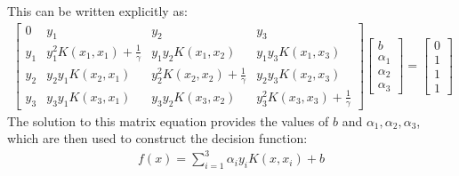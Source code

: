 This can be written explicitly as:
\begin{align*}
	\begin{bmatrix}
	0 & y_1 & y_2 & y_3 \\
	y_1 & y_1^2 K(x_1, x_1) + \frac{1}{\gamma} & y_1 y_2 K(x_1, x_2) & y_1 y_3 K(x_1, x_3) \\
	y_2 & y_2 y_1 K(x_2, x_1) & y_2^2 K(x_2, x_2) + \frac{1}{\gamma} & y_2 y_3 K(x_2, x_3) \\
	y_3 & y_3 y_1 K(x_3, x_1) & y_3 y_2 K(x_3, x_2) & y_3^2 K(x_3, x_3) + \frac{1}{\gamma}
	\end{bmatrix}
	\begin{bmatrix}
	b \\
	\alpha_1 \\
	\alpha_2 \\
	\alpha_3
	\end{bmatrix}
	=
	\begin{bmatrix}
	0 \\
	1 \\
	1 \\
	1
	\end{bmatrix}
\end{align*}
The solution to this matrix equation provides the values of $b$ and $ \alpha_1, \alpha_2, \alpha_3$, which are then used to construct the decision function:
\begin{align*}
	f(x) = \sum_{i=1}^3 \alpha_i y_i K(x, x_i) + b
\end{align*}
